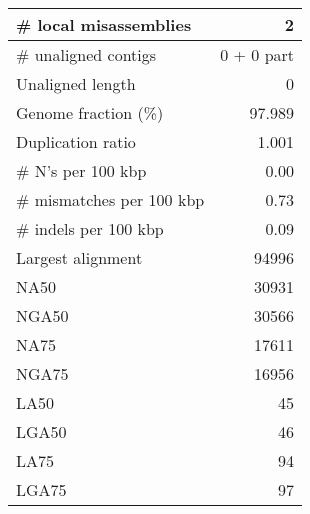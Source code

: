 \documentclass[12pt,a4paper]{article}
\begin{document}
\begin{table}[ht]
\begin{center}
\begin{tabular}{|l*{1}{|r}|}
\# local misassemblies & 2 \\ \hline
\# unaligned contigs & 0 + 0 part \\ \hline
Unaligned length & 0 \\ \hline
Genome fraction (\%) & 97.989 \\ \hline
Duplication ratio & 1.001 \\ \hline
\# N's per 100 kbp & 0.00 \\ \hline
\# mismatches per 100 kbp & 0.73 \\ \hline
\# indels per 100 kbp & 0.09 \\ \hline
Largest alignment & 94996 \\ \hline
NA50 & 30931 \\ \hline
NGA50 & 30566 \\ \hline
NA75 & 17611 \\ \hline
NGA75 & 16956 \\ \hline
LA50 & 45 \\ \hline
LGA50 & 46 \\ \hline
LA75 & 94 \\ \hline
LGA75 & 97 \\ \hline
\end{tabular}
\end{center}
\end{table}
\end{document}

